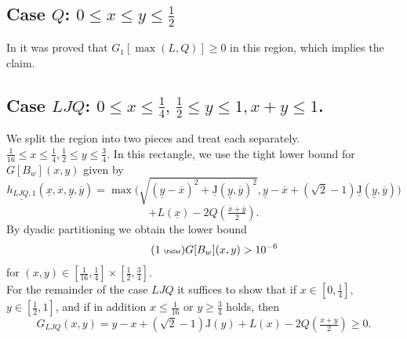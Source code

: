 \documentclass[11pt]{amsart}
\theoremstyle{plain}
\newcommand{\auto}{\tag{\addtocounter{equation}{1}\theequation\;{\tiny\faCar}}}
\theoremstyle{definition}
\theoremstyle{remark}
\numberwithin{equation}{section}
\begin{document}
\subsection{\texorpdfstring{Case $Q$: $0\le x\leq y \leq\frac12$}{Case Q}}
\label{sec:caseQ}
In \cite[Prop. 6.2]{DIR24} it was proved that $G_{1}[\max(L,Q)]\ge 0$ in this region, which implies the claim.

\subsection{\texorpdfstring{Case $LJQ$: $0\leq x \leq \tfrac{1}{4},\,\tfrac{1}{2}\leq y \leq 1,x+y\leq 1$.}{Case LJQ}}
\label{sec:caseLJQ}
We split the region into two pieces and treat each separately.\\

 $\tfrac{1}{16}\leq x\leq \tfrac{1}{4}, \tfrac{1}{2}\leq y\leq \tfrac34$.
\label{sec:LJQ-I}
In this rectangle, we use the tight lower bound for $G[B_w](x,y)$ given by
\[ \underline{h_{LJQ,1}}(\underline{x},\overline{x},\underline{y},\overline{y})=
\max\Big(\sqrt{(\underline{y}-\overline{x})^{2}+\underline{{\mathrm{J}}}(\underline{y},\overline{y})^{2}}, \underline{y}-\overline{x}+(\sqrt{2}-1) \underline{{\mathrm{J}}}(\underline{y},\overline{y})\Big) \]
\[ + L(\underline{x}) - 2 Q(\tfrac{\overline{x}+\overline{y}}{2}).
\]
By dyadic partitioning we obtain the lower bound
\begin{equation}\label{eqn:h_LJQ_1_auto}\auto
G[B_w](x,y)>10^{-6}
\end{equation}
for $(x,y)\in [\frac1{16},\frac14]\times[\frac12,\frac34]$. \\

\label{sec:LJQ-II}
For the remainder of the case $LJQ$ it suffices to show that if
$x\in [0,\frac14],$ $y\in [\frac12,1]$, and
if in addition $x\le \frac1{16}$ or $y\ge \frac34$ holds, then
\[ G_{LJQ}(x,y)=y-x + (\sqrt{2}-1) {\mathrm{J}}(y) +L(x)-2Q(\tfrac{x+y}{2})\geq 0.\]
\end{document}
